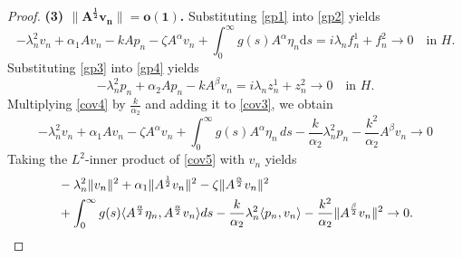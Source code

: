 \documentclass[12pt,reqno]{article}
\begin{document}
\begin{proof}
		{\bf \noindent(3) $\bm{\|A^{\frac{1}{2}} v_n\|=o(1)}$.}	
		Substituting \eqref{gp1} into \eqref{gp2} yields
		\begin{equation}\label{cov3}
			-\lambda_n^2 v_n + \alpha_1 A v_n - k A p_n - \zeta A^\alpha v_n + \int_0^\infty g(s) A^\alpha \eta_n \mathrm{d}s =i\lambda_nf_n^1+f_n^2\to 0 \quad \text{in } H.
		\end{equation}
		Substituting \eqref{gp3} into \eqref{gp4}  yields
		\begin{equation}\label{cov4}
			-\lambda_n^2 p_n + \alpha_2 A p_n - k A^\beta v_n =i\lambda_nz_n^1+z_n^2\to 0 \quad \text{in } H.
		\end{equation}
		Multiplying \eqref{cov4} by $\frac{k}{\alpha_2}$ and adding it to \eqref{cov3}, we obtain
		\begin{equation}\label{cov5}
			-\lambda_n^2 v_n + \alpha_1 A v_n - \zeta A^\alpha v_n + \int_0^\infty g(s) A^\alpha \eta_n \, ds - \frac{k}{\alpha_2} \lambda_n^2 p_n - \frac{k^2}{\alpha_2} A^\beta v_n \to 0
		\end{equation}
		Taking the $L^2$-inner product of \eqref{cov5} with $v_n$ yields
		\begin{align}\label{eq:inner_product_vn}
			&-\lambda_n^2 \|v_n\|^2 + \alpha_1 \|A^{\frac{1}{2}} v_n\|^2 - \zeta \|A^{\frac{\alpha}{2}} v_n\|^2 \notag \\
			&+ \int_0^\infty g(s) \langle A^{\frac{\alpha}{2}} \eta_n, A^{\frac{\alpha}{2}} v_n \rangle ds - \frac{k}{\alpha_2} \lambda_n^2 \langle p_n, v_n \rangle
			- \frac{k^2}{\alpha_2} \|A^{\frac{\beta}{2}} v_n\|^2 \to 0.
		\end{align}
		

\end{proof}
\end{document}
